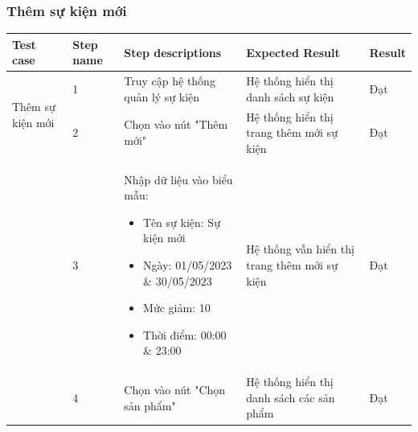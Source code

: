 \newpage

\subsubsection{Thêm sự kiện mới}
{
    \setlength\extrarowheight{6pt}
    \begin{longtable}{| p{2.5cm}| p{1cm}| p{5.5cm}| p{4.5cm} | p{1.5cm} |}
        \hline
        \textbf{Test case}                           & \textbf{Step name}                           & \textbf{Step descriptions}                                & \textbf{Expected Result}                                             & \textbf{Result} \\
        \hline
        \multirow[t]{2}{2.5cm}{Thêm sự kiện mới}     & 1                                            & Truy cập hệ thống quản lý sự kiện                         & Hệ thống hiển thị danh sách sự kiện                                  & Đạt             \\
        \cline{2-5}
                                                     & 2                                            & Chọn vào nút "Thêm mới"                                   & Hệ thống hiển thị trang thêm mới sự kiện                             & Đạt             \\
        \cline{2-5}
                                                     & 3                                            & Nhập dữ liệu vào biểu mẫu:
        \begin{itemize}
            \item Tên sự kiện: Sự kiện mới
            \item Ngày: 01/05/2023 \& 30/05/2023
            \item Mức giảm: 10
            \item Thời điểm: 00:00 \& 23:00
        \end{itemize}         & Hệ thống vẫn hiển thị trang thêm mới sự kiện & Đạt                                                                                                                                                                       \\
        \cline{2-5}
                                                     & 4                                            & Chọn vào nút "Chọn sản phẩm"                              & Hệ thống hiển thị danh sách các sản phẩm                             & Đạt             \\

\end{longtable}}
